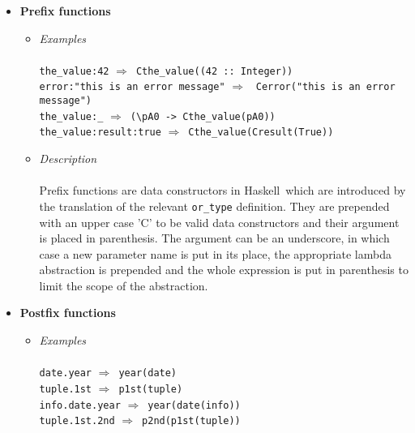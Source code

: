 \documentclass[diploma]{softlab-thesis}
\def\H{Haskell}
\def\lra{$\Longrightarrow$\ }
\begin{document}
\begin{itemize}
\item
\textbf{Prefix functions}
\begin{itemize}
\item
\textit{Examples}\\\\
\verb|the_value:42| \lra \verb|Cthe_value((42 :: Integer))| \\
\texttt{error:"this is an error message"} \lra
\texttt{Cerror("this is an error message")} \\
\verb|the_value:_| \lra \verb|(\pA0 -> Cthe_value(pA0))| \\
\verb|the_value:result:true| \lra \verb|Cthe_value(Cresult(True))| \\

\item
\textit{Description}\\\\
Prefix functions are data constructors in \H\ which are introduced by the
translation of the relevant \verb|or_type| definition. They are prepended
with an upper case 'C' to be valid data constructors and their argument is
placed in parenthesis. The argument can be an underscore, in which case a new
parameter name is put in its place, the appropriate lambda abstraction is
prepended and the whole expression is put in parenthesis to limit the scope of
the abstraction.
\end{itemize}

\item
\textbf{Postfix functions}

\begin{itemize}
\item
\textit{Examples}\\\\
\texttt{date.year} \lra \texttt{year(date)} \\
\texttt{tuple.1st} \lra \texttt{p1st(tuple)} \\
\texttt{info.date.year} \lra \texttt{year(date(info))} \\
\texttt{tuple.1st.2nd} \lra \texttt{p2nd(p1st(tuple))} \\


\end{itemize}
\end{itemize}
\end{document}
